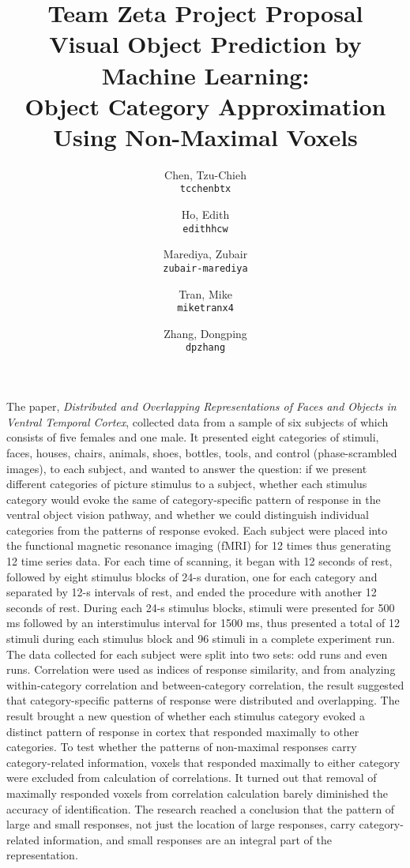 \documentclass[11pt]{article}
\title{\textbf{Team Zeta Project Proposal}\\
Visual Object Prediction by Machine Learning:\\ 
Object Category Approximation Using Non-Maximal Voxels}
\author{
  Chen, Tzu-Chieh\\
  \texttt{tcchenbtx}
  \and
  Ho, Edith\\
  \texttt{edithhcw}
  \and
  Marediya, Zubair\\
  \texttt{zubair-marediya}
  \and
  Tran, Mike\\
  \texttt{miketranx4}
  \and
  Zhang, Dongping\\
  \texttt{dpzhang}
}
\begin{document}
\maketitle

The paper, \emph{Distributed and Overlapping Representations of Faces
and Objects in Ventral Temporal Cortex}\cite{object_rec_main}, collected data 
from a sample of six subjects of which consists of five females and one male. 
It presented eight categories of stimuli, faces, houses, chairs, animals, 
shoes, bottles, tools, and control (phase-scrambled images), to each subject, 
and wanted to answer the question: if we present different categories of 
picture stimulus to a subject, whether each stimulus category would evoke the 
same of category-specific pattern of response in the ventral object vision 
pathway, and whether we could distinguish individual categories from the 
patterns of response evoked. Each subject were placed into the functional 
magnetic resonance imaging (fMRI) for 12 times thus generating 12 time series 
data. For each time of scanning, it began with 12 seconds of rest, followed by 
eight stimulus blocks of 24-s duration, one for each category and separated by 
12-s intervals of rest, and ended the procedure with another 12 seconds of 
rest. During each 24-s stimulus blocks, stimuli were presented for 500 ms 
followed by an interstimulus interval for 1500 ms, thus presented a total of 12 
stimuli during each stimulus block and 96 stimuli in a complete experiment 
run.\\

The data collected for each subject were split into two sets: odd runs and even 
runs. Correlation were used as indices of response similarity, and from 
analyzing within-category correlation and between-category correlation, the 
result suggested that category-specific patterns of response were distributed 
and overlapping. The result brought a new question of whether each stimulus 
category evoked a distinct pattern of response in cortex that responded 
maximally to other categories. To test whether the patterns of non-maximal 
responses carry category-related information, voxels that responded maximally 
to either category were excluded from calculation of correlations. It turned 
out that removal of maximally responded voxels from correlation calculation 
barely diminished the accuracy of identification. The research reached a 
conclusion that the pattern of large and small responses, not just the location 
of large responses, carry category-related information, and small responses 
are an integral part of the representation.\\
\end{document}
